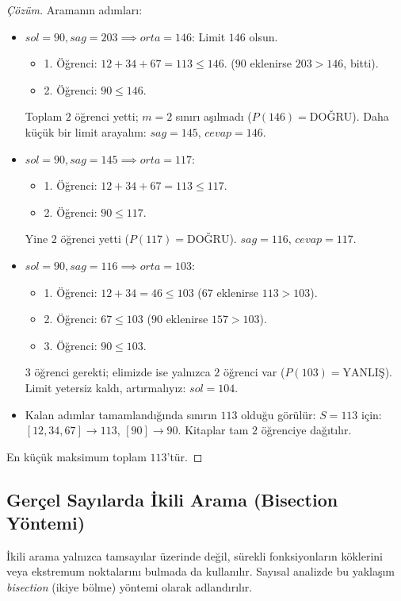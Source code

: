 \begin{proof}[Çözüm]
Aramanın adımları:
\begin{itemize}
    \item $sol = 90, sag = 203 \implies orta = 146$:
    Limit $146$ olsun.
    \begin{itemize}
        \item 1. Öğrenci: $12 + 34 + 67 = 113 \le 146$. ($90$ eklenirse $203 > 146$, bitti).
        \item 2. Öğrenci: $90 \le 146$.
    \end{itemize}
    Toplam $2$ öğrenci yetti; $m = 2$ sınırı aşılmadı ($P(146) = \text{DOĞRU}$).
    Daha küçük bir limit arayalım: $sag = 145$, $cevap = 146$.
    \item $sol = 90, sag = 145 \implies orta = 117$:
    \begin{itemize}
        \item 1. Öğrenci: $12 + 34 + 67 = 113 \le 117$.
        \item 2. Öğrenci: $90 \le 117$.
    \end{itemize}
    Yine $2$ öğrenci yetti ($P(117) = \text{DOĞRU}$). $sag = 116$, $cevap = 117$.
    \item $sol = 90, sag = 116 \implies orta = 103$:
    \begin{itemize}
        \item 1. Öğrenci: $12 + 34 = 46 \le 103$ ($67$ eklenirse $113 > 103$).
        \item 2. Öğrenci: $67 \le 103$ ($90$ eklenirse $157 > 103$).
        \item 3. Öğrenci: $90 \le 103$.
    \end{itemize}
    $3$ öğrenci gerekti; elimizde ise yalnızca $2$ öğrenci var ($P(103) = \text{YANLIŞ}$).
    Limit yetersiz kaldı, artırmalıyız: $sol = 104$.
    \item Kalan adımlar tamamlandığında sınırın $113$ olduğu görülür:
    $S = 113$ için: $[12, 34, 67] \to 113$, $[90] \to 90$. Kitaplar tam $2$ öğrenciye dağıtılır.
\end{itemize}
En küçük maksimum toplam $113$'tür.
\end{proof}

\subsection{Gerçel Sayılarda İkili Arama (Bisection Yöntemi)}

İkili arama yalnızca tamsayılar üzerinde değil, sürekli fonksiyonların köklerini veya ekstremum noktalarını bulmada da kullanılır. Sayısal analizde bu yaklaşım \emph{bisection} (ikiye bölme) yöntemi olarak adlandırılır.

